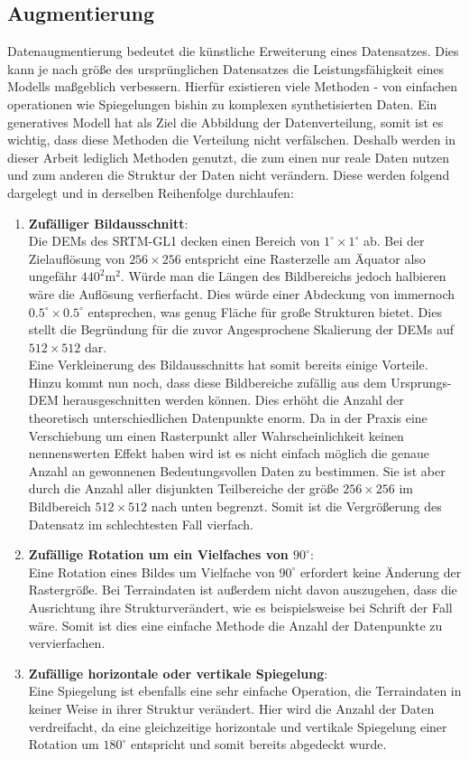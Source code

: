 \subsection{Augmentierung}
\label{subsec:Augmentierung}

Datenaugmentierung bedeutet die künstliche Erweiterung eines Datensatzes. Dies kann je nach größe des ursprünglichen Datensatzes die Leistungsfähigkeit eines Modells maßgeblich verbessern. Hierfür existieren viele Methoden - von einfachen operationen wie Spiegelungen bishin zu komplexen synthetisierten Daten. Ein generatives Modell hat als Ziel die Abbildung der Datenverteilung, somit ist es wichtig, dass diese Methoden die Verteilung nicht verfälschen. Deshalb werden in dieser Arbeit lediglich Methoden genutzt, die zum einen nur reale Daten nutzen und zum anderen die Struktur der Daten nicht verändern. Diese werden folgend dargelegt und in derselben Reihenfolge durchlaufen:
\begin{enumerate}
    \item \textbf{Zufälliger Bildausschnitt}: \\
    Die DEMs des SRTM-GL1 decken einen Bereich von $1^{\circ}\times1^{\circ}$ ab. Bei der Zielauflösung von $256\times256$ entspricht eine Rasterzelle am Äquator also ungefähr $440^2\text{m}^2$. Würde man die Längen des Bildbereichs jedoch halbieren wäre die Auflösung verfierfacht. Dies würde einer Abdeckung von immernoch $0.5^{\circ}\times0.5^{\circ}$ entsprechen, was genug Fläche für große Strukturen bietet. Dies stellt die Begründung für die zuvor Angesprochene Skalierung der DEMs auf $512\times512$ dar. \\ 
    Eine Verkleinerung des Bildausschnitts hat somit bereits einige Vorteile. Hinzu kommt nun noch, dass diese Bildbereiche zufällig aus dem Ursprungs-DEM herausgeschnitten werden können. Dies erhöht die Anzahl der theoretisch unterschiedlichen Datenpunkte enorm. Da in der Praxis eine Verschiebung um einen Rasterpunkt aller Wahrscheinlichkeit keinen nennenswerten Effekt haben wird ist es nicht einfach möglich die genaue Anzahl an gewonnenen Bedeutungsvollen Daten zu bestimmen. Sie ist aber durch die Anzahl aller disjunkten Teilbereiche der größe $256\times256$ im Bildbereich $512\times512$ nach unten begrenzt. Somit ist die Vergrößerung des Datensatz im schlechtesten Fall vierfach.
    \item \textbf{Zufällige Rotation um ein Vielfaches von $90^{\circ}$}: \\
    Eine Rotation eines Bildes um Vielfache von $90^{\circ}$ erfordert keine Änderung der Rastergröße. Bei Terraindaten ist außerdem nicht davon auszugehen, dass die Ausrichtung ihre Strukturverändert, wie es beispielsweise bei Schrift der Fall wäre. Somit ist dies eine einfache Methode die Anzahl der Datenpunkte zu vervierfachen.
    \item \textbf{Zufällige horizontale oder vertikale Spiegelung}: \\
    Eine Spiegelung ist ebenfalls eine sehr einfache Operation, die Terraindaten in keiner Weise in ihrer Struktur verändert. Hier wird die Anzahl der Daten verdreifacht, da eine gleichzeitige horizontale und vertikale Spiegelung einer Rotation um $180^{\circ}$ entspricht und somit bereits abgedeckt wurde. 
\end{enumerate}

